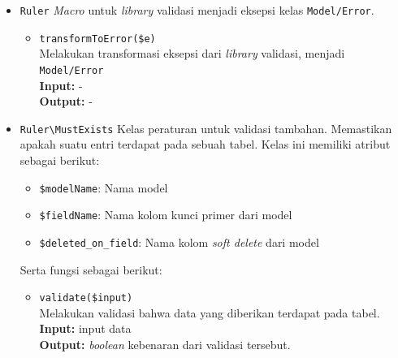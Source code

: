 \begin{itemize}
        \item \texttt{Ruler} \textit{Macro} untuk \textit{library} validasi
            menjadi eksepsi kelas \texttt{Model/Error}.
            \begin{itemize}
                \item \texttt{transformToError(\$e)} \\
                    Melakukan transformasi eksepsi dari \textit{library}
                    validasi, menjadi \texttt{Model/Error} \\
                    \textbf{Input:} -\\
                    \textbf{Output:} -
            \end{itemize}
            
        \item \texttt{Ruler\textbackslash MustExists} Kelas peraturan untuk validasi tambahan.
            Memastikan apakah suatu entri terdapat pada sebuah tabel. Kelas ini
            memiliki atribut sebagai berikut:
            \begin{itemize}
                \item \texttt{\$modelName}: Nama model
                \item \texttt{\$fieldName}: Nama kolom kunci primer dari model
                \item \texttt{\$deleted\_on\_field}: Nama kolom \textit{soft
                delete} dari model
            \end{itemize}
            Serta fungsi sebagai berikut:
            \begin{itemize}
                \item \texttt{validate(\$input)} \\
                    Melakukan validasi bahwa data yang diberikan terdapat pada
                    tabel.\\
                    \textbf{Input:} input data\\
                    \textbf{Output:} \textit{boolean} kebenaran dari validasi
                    tersebut.
            \end{itemize}
            

\end{itemize}
